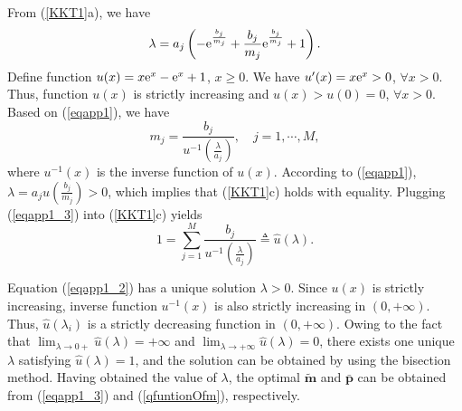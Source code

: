 \documentclass[journal]{IEEEtran}
\begin{document}
From (\ref{KKT1}a), we have
\begin{equation}\label{eqapp1}
\lambda=a_{j}\left (-\textrm{e}^{\frac{b_{j}} {m_{j}}}+\frac{b_{j}} {m_{j}} \textrm e^{\frac{b_{j}} {m_{j}}} +1\right).
\end{equation}
Define function
$u(x)= x \textrm e^x -\textrm e^x +1$, $x \geq 0$.
We have $u'(x)=x \textrm e^x >0$, $\forall x >0$.
Thus, function $u(x)$ is strictly increasing and $u(x) > u(0) =0$, $\forall x >0$.
Based on (\ref{eqapp1}), we have
\begin{equation}\label{eqapp1_3}
{m_{j}}=\frac {b_{j}}{u^{-1}\left({\frac{\lambda} {a_{j}}}\right)},\quad j =1, \cdots, M,
\end{equation}
where $u^{-1}(x)$ is the inverse function of $u(x)$.
According to (\ref{eqapp1}), $\lambda=a_j u\left({\frac{b_{j}} {m_{j}}}\right)>0$, which implies that (\ref{KKT1}c) holds with equality.
Plugging (\ref{eqapp1_3}) into (\ref{KKT1}c) yields
\begin{equation}\label{eqapp1_2}
1 =\sum_{j=1}^M
\frac{b_{j}} { u^{-1} (\frac { \lambda} {a_{j}} )}
\triangleq  \hat u(\lambda).\end{equation}

Equation (\ref{eqapp1_2}) has a unique solution $\lambda>0$.
Since $u(x)$ is strictly increasing,
inverse function $u^{-1}(x)$ is also strictly increasing in $(0, +\infty)$.
Thus, $\hat u(\lambda_i)$ is a strictly decreasing function in $(0, +\infty)$.
Owing to the fact that $\lim_{\lambda \rightarrow 0+} \hat u(\lambda) =+\infty$
and $\lim_{\lambda \rightarrow +\infty} \hat u(\lambda) =0$,
there exists one unique $\lambda$ satisfying $\hat u(\lambda)=1$, and the solution can be obtained by using the bisection method.
Having obtained the value of $\lambda$, the optimal $\pmb {\tilde m }$ and $\pmb {\bar p}$ can be obtained from (\ref{eqapp1_3}) and (\ref{qfuntionOfm}), respectively.
\end{document}
